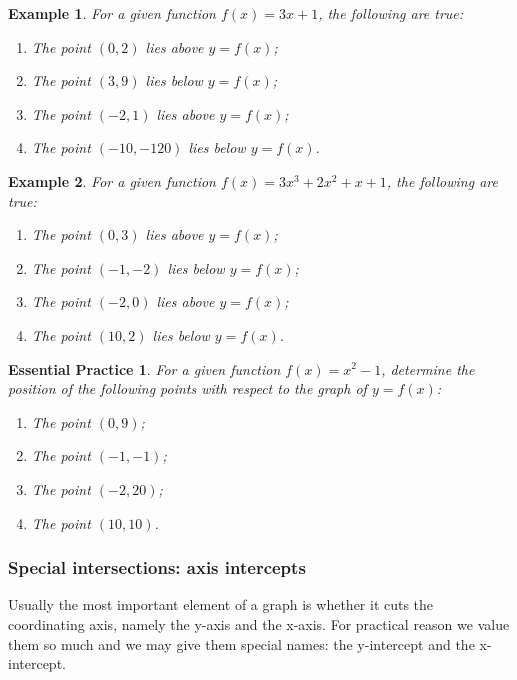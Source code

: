 \documentclass[12pt]{article}
\newtheorem*{example}{Example}
\newtheorem{exercise}{Essential Practice}[subsubsection]
\begin{document}
    \begin{example}
        For a given function $f(x)=3x+1$, the following are true:\begin{enumerate}
            \item The point $(0,2)$ lies above $y=f(x)$;
            \item The point $(3,9)$ lies below $y=f(x)$;
            \item The point $(-2,1)$ lies above $y=f(x)$;
            \item The point $(-10,-120)$ lies below $y=f(x)$.
        \end{enumerate} 
    \end{example}

    \begin{example}
        For a given function $f(x)=3x^3+2x^2+x+1$, the following are true:\begin{enumerate}
            \item The point $(0,3)$ lies above $y=f(x)$;
            \item The point $(-1,-2)$ lies below $y=f(x)$;
            \item The point $(-2,0)$ lies above $y=f(x)$;
            \item The point $(10,2)$ lies below $y=f(x)$.
        \end{enumerate} 
    \end{example}

    \begin{exercise}
        For a given function $f(x)=x^2-1$, determine the position of the following points with respect to the graph of $y=f(x)$:\begin{enumerate}
            \item The point $(0,9)$;
            \item The point $(-1,-1)$;
            \item The point $(-2,20)$;
            \item The point $(10,10)$.
        \end{enumerate} 
    \end{exercise}

    \subsubsection{Special intersections: axis intercepts}

    Usually the most important element of a graph is whether it cuts the coordinating axis, namely the y-axis and the x-axis. For practical reason we value them so much and we may give them special names: the y-intercept and the x-intercept.
\end{document}
